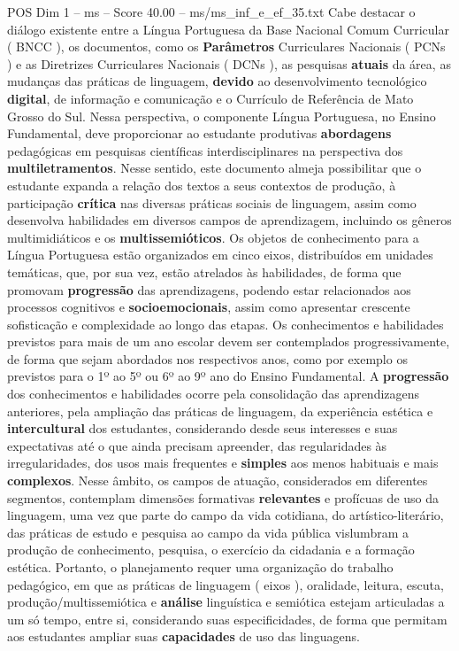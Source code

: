 \begin{textsample}{POS Dim 1 – ms – Score 40.00 – ms/ms\_inf\_e\_ef\_35.txt}
Cabe destacar o diálogo existente entre a Língua Portuguesa da Base Nacional Comum Curricular ( BNCC ), os documentos, como os \textbf{Parâmetros} Curriculares Nacionais ( PCNs ) e as Diretrizes Curriculares Nacionais ( DCNs ), as pesquisas \textbf{atuais} da área, as mudanças das práticas de linguagem, \textbf{devido} ao desenvolvimento tecnológico \textbf{digital}, de informação e comunicação e o Currículo de Referência de Mato Grosso do Sul.
Nessa perspectiva, o componente Língua Portuguesa, no Ensino Fundamental, deve proporcionar ao estudante produtivas \textbf{abordagens} pedagógicas em pesquisas científicas interdisciplinares na perspectiva dos \textbf{multiletramentos}.
Nesse sentido, este documento almeja possibilitar que o estudante expanda a relação dos textos a seus contextos de produção, à participação \textbf{crítica} nas diversas práticas sociais de linguagem, assim como desenvolva habilidades em diversos campos de aprendizagem, incluindo os gêneros multimidiáticos e os \textbf{multissemióticos}.
Os objetos de conhecimento para a Língua Portuguesa estão organizados em cinco eixos, distribuídos em unidades temáticas, que, por sua vez, estão atrelados às habilidades, de forma que promovam \textbf{progressão} das aprendizagens, podendo estar relacionados aos processos cognitivos e \textbf{socioemocionais}, assim como apresentar crescente sofisticação e complexidade ao longo das etapas.
Os conhecimentos e habilidades previstos para mais de um ano escolar devem ser contemplados progressivamente, de forma que sejam abordados nos respectivos anos, como por exemplo os previstos para o 1º ao 5º ou 6º ao 9º ano do Ensino Fundamental.
A \textbf{progressão} dos conhecimentos e habilidades ocorre pela consolidação das aprendizagens anteriores, pela ampliação das práticas de linguagem, da experiência estética e \textbf{intercultural} dos estudantes, considerando desde seus interesses e suas expectativas até o que ainda precisam apreender, das regularidades às irregularidades, dos usos mais frequentes e \textbf{simples} aos menos habituais e mais \textbf{complexos}.
Nesse âmbito, os campos de atuação, considerados em diferentes segmentos, contemplam dimensões formativas \textbf{relevantes} e profícuas de uso da linguagem, uma vez que parte do campo da vida cotidiana, do artístico-literário, das práticas de estudo e pesquisa ao campo da vida pública vislumbram a produção de conhecimento, pesquisa, o exercício da cidadania e a formação estética.
Portanto, o planejamento requer uma organização do trabalho pedagógico, em que as práticas de linguagem ( eixos ), oralidade, leitura, escuta, produção/multissemiótica e \textbf{análise} linguística e semiótica estejam articuladas a um só tempo, entre si, considerando suas especificidades, de forma que permitam aos estudantes ampliar suas \textbf{capacidades} de uso das linguagens.

\end{textsample}
